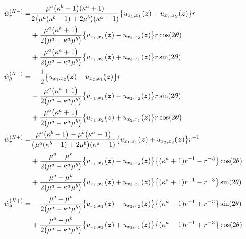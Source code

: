 \begin{align}
	\hat{w}_{r}^{(I\hspace{-.15em}I-)}=&
		\frac{\mu^{a}\bigl(\kappa^{b}-1\bigr)(\kappa^{a}+1)}{2\bigl(\mu^{a}(\kappa^{b}-1)+2\mu^{b}\bigr)(\kappa^{a}-1)}
		\bigl\{u_{x_{1},x_{1}}(\bm{z})+u_{x_{2},x_{2}}(\bm{z})\bigr\}r
		\nonumber
		\\
		&+\frac{\mu^{a}\bigl(\kappa^{a}+1\bigr)}{2\bigl(\mu^{a}+\kappa^{a}\mu^{b}\bigr)}
		\bigl\{u_{x_{1},x_{1}}(\bm{z})-u_{x_{2},x_{2}}(\bm{z})\bigr\}r\cos(2\theta)
		\nonumber
		\\
		&+\frac{\mu^{a}\bigl(\kappa^{a}+1\bigr)}{2\bigl(\mu^{a}+\kappa^{a}\mu^{b}\bigr)}
		\bigl\{u_{x_{1},x_{2}}(\bm{z})+u_{x_{2},x_{1}}(\bm{z})\bigr\}r\sin(2\theta)
		\\
	\hat{w}_{\theta}^{(I\hspace{-.15em}I-)}=&
		-\frac{1}{2}\bigl\{u_{x_{1},x_{2}}(\bm{z})-u_{x_{2},x_{1}}(\bm{z})\bigr\}r
		\nonumber
		\\
		&-\frac{\mu^{a}\bigl(\kappa^{a}+1\bigr)}{2\bigl(\mu^{a}+\kappa^{a}\mu^{b}\bigr)}
		\bigl\{u_{x_{1},x_{1}}(\bm{z})-u_{x_{2},x_{2}}(\bm{z})\bigr\}r\sin(2\theta)
		\nonumber
		\\
		&+\frac{\mu^{a}\bigl(\kappa^{a}+1\bigr)}{2\bigl(\mu^{a}+\kappa^{a}\mu^{b}\bigr)}
		\bigl\{u_{x_{1},x_{2}}(\bm{z})+u_{x_{2},x_{1}}(\bm{z})\bigr\}r\cos(2\theta)
		\\
	\hat{w}_{r}^{(I\hspace{-.15em}I+)}=&
		\frac{\mu^{a}\bigl(\kappa^{b}-1\bigr)-\mu^{b}\bigl(\kappa^{a}-1\bigr)}
		{\bigl(\mu^{a}(\kappa^{b}-1)+2\mu^{b}\bigr)(\kappa^{a}-1)}
		\bigl\{u_{x_{1},x_{1}}(\bm{z})+u_{x_{2},x_{2}}(\bm{z})\bigr\}r^{-1}
		\nonumber
		\\
		&+\frac{\mu^{a}-\mu^{b}}{2\bigl(\mu^{a}+\kappa^{a}\mu^{b}\bigr)}
		\bigl\{u_{x_{1},x_{1}}(\bm{z})-u_{x_{2},x_{2}}(\bm{z})\bigr\}
		\bigl\{(\kappa^{a}+1)r^{-1}-r^{-3}\bigr\}\cos(2\theta)
		\nonumber
		\\
		&+\frac{\mu^{a}-\mu^{b}}{2\bigl(\mu^{a}+\kappa^{a}\mu^{b}\bigr)}
		\bigl\{u_{x_{1},x_{2}}(\bm{z})+u_{x_{2},x_{1}}(\bm{z})\bigr\}
		\bigl\{(\kappa^{a}+1)r^{-1}-r^{-3}\bigr\}\sin(2\theta)
		\\
	\hat{w}_{\theta}^{(I\hspace{-.15em}I+)}=&
		-\frac{\mu^{a}-\mu^{b}}{2\bigl(\mu^{a}+\kappa^{a}\mu^{b}\bigr)}
		\bigl\{u_{x_{1},x_{1}}(\bm{z})-u_{x_{2},x_{2}}(\bm{z})\bigr\}
		\bigl\{(\kappa^{a}-1)r^{-1}+r^{-3}\bigr\}\sin(2\theta)
		\nonumber
		\\
		&+\frac{\mu^{a}-\mu^{b}}{2\bigl(\mu^{a}+\kappa^{a}\mu^{b}\bigr)}
		\bigl\{u_{x_{1},x_{2}}(\bm{z})+u_{x_{2},x_{1}}(\bm{z})\bigr\}
		\bigl\{(\kappa^{a}-1)r^{-1}+r^{-3}\bigr\}\cos(2\theta)
\end{align}
\newpage
